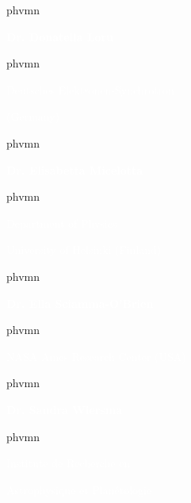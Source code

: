 \begin{multicols}{2}
\begin{shaded}
\fontsize{14}{10}  {phv}{m}{n} \selectfont 

\textcolor{white}{\textbf{Dr. Donatella Loru}}

\fontsize{13}{10}  {phv}{m}{n} \selectfont 

\textcolor{white}{Deutsches Elektronen-Synchrotron}

\vspace{-0.15cm}

\textcolor{white}{(Germany)}

\vspace{0.2cm}

\fontsize{14}{10}  {phv}{m}{n} \selectfont 

\textcolor{white}{\textbf{Dr. Elisabetta Micelotta}}

\fontsize{13}{10}  {phv}{m}{n} \selectfont 

\textcolor{white}{Department of Physics}

\vspace{-0.15cm}

\textcolor{white}{University of Helsinki (Finland)}

\vspace{0.2cm}


\fontsize{14}{10}  {phv}{m}{n} \selectfont 

\textcolor{white}{\textbf{Dr. Ella Sciamma-O'Brien}}

\fontsize{13}{10}  {phv}{m}{n} \selectfont 

\textcolor{white}{NASA Ames Research Center (USA)}

\vspace{0.2cm}


\fontsize{14}{10}  {phv}{m}{n} \selectfont 

\textcolor{white}{\textbf{Dr. Sandra Wiersma}}

\fontsize{13}{10}  {phv}{m}{n} \selectfont 

\textcolor{white}{Institute de Recherche en}

\vspace{-0.1cm}

\textcolor{white}{Astrophysique et Planétologie}

\vspace{-0.15cm}


\end{shaded}
\end{multicols}
